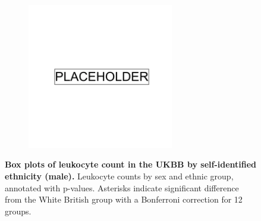 \begin{figure}[ht]
    \centering
    \begin{subfigure}{\textwidth}
    \includegraphics[width=0.7\textwidth]{placeholder.png}
    \end{subfigure}
    \caption[Box plots of leukocyte count in the UKBB by self-identified ethnicity (male)]{\textbf{Box plots of leukocyte count in the UKBB by self-identified ethnicity (male).} Leukocyte counts by sex and ethnic group, annotated with p-values. Asterisks indicate significant difference from the White British group with a Bonferroni correction for 12 groups.}
    \label{fig:supp_box_leukocyte_m}
\end{figure}

\newpage

